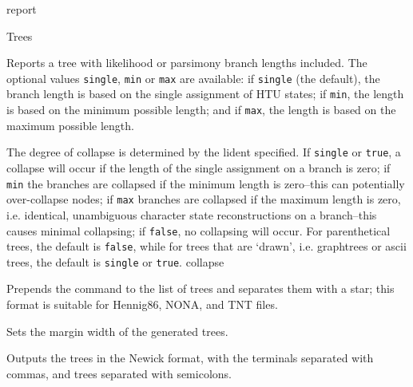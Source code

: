 \begin{command}{report}{}
\begin{arguments}
\begin{argumentgroup}{Trees}
{\begin{description}


{Reports a tree with likelihood or parsimony branch lengths included. 
The optional \poylident values \texttt{single}, \texttt{min} or \texttt{max} 
are available: if \texttt{single} (the default), the branch length is based on the single 
assignment of HTU states; if \texttt{min}, the length is based on the 
minimum possible length; and if \texttt{max}, the length is based 
on the maximum possible length.}
{}


{The degree of collapse is determined by the lident specified. 
If \texttt{single} or \texttt{true}, a collapse will 
occur if the length of the single assignment on a branch is zero; 
if \texttt{min} the branches are collapsed if the minimum 
length is zero--this can potentially over-collapse nodes; if 
\texttt{max} branches are collapsed if the maximum length is 
zero, i.e. identical, unambiguous character state reconstructions 
on a branch--this causes minimal collapsing; if \texttt{false}, 
no collapsing will occur. For parenthetical trees, the default
is \texttt{false}, while for trees that are `drawn', i.e. graphtrees or
ascii trees, the default is \texttt{single} or \texttt{true}.}
{collapse}

{Prepends the  command to the list of
trees and separates them with a star; this format is
suitable for Hennig86, NONA, and TNT files.}
{}

{Sets the margin width of the generated trees.}
{}

{Outputs the trees in the Newick format, with the
terminals separated with commas, and trees separated
with semicolons.}
{}


\end{description}}
\end{argumentgroup}
\end{arguments}
\end{command}
